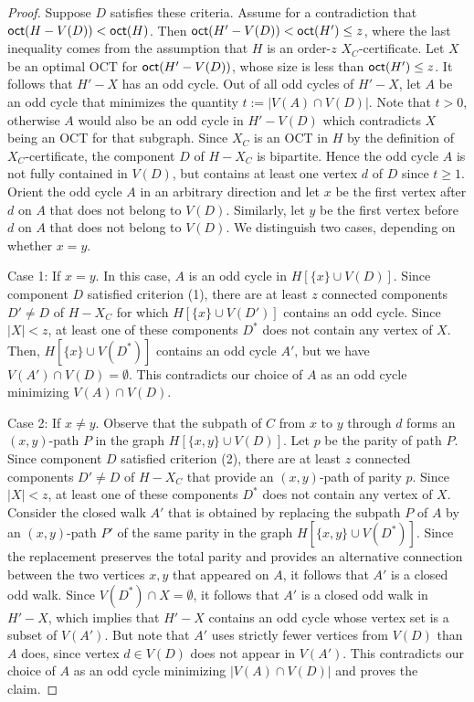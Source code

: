 \begin{proof}
Suppose $D$ satisfies these criteria.
Assume for a contradiction that $\textnormal{\textsf{oct}}(H - V(D)) < \textnormal{\textsf{oct}}(H)$.
Then $\textnormal{\textsf{oct}}(H' - V(D)) < \textnormal{\textsf{oct}}(H') \leq z$,
where the last inequality comes from the assumption that $H$ is an order-$z$ $X_C$-certificate.
%
Let $X$ be an optimal OCT for $\textnormal{\textsf{oct}}(H' - V(D))$, whose size is less than $\textnormal{\textsf{oct}}(H') \leq z$.
It follows that $H' - X$ has an odd cycle.
Out of all odd cycles of $H' - X$,
let $A$ be an odd cycle that minimizes the quantity $t := |V(A) \cap V(D)|$.
Note that $t > 0$, otherwise $A$ would also be an odd cycle in $H' - V(D)$
which contradicts $X$ being an OCT for that subgraph.
%
Since $X_C$ is an OCT in $H$ by the definition of $X_C$-certificate,
the component $D$ of $H - X_C$ is bipartite.
Hence the odd cycle $A$ is not fully contained in $V(D)$,
but contains at least one vertex $d$ of $D$ since $t \geq 1$.
%
Orient the odd cycle $A$ in an arbitrary direction and let $x$ be the first vertex after $d$ on $A$ that does not belong to $V(D)$.
Similarly, let $y$ be the first vertex before $d$ on $A$ that does not belong to $V(D)$.
We distinguish two cases, depending on whether $x=y$.

Case 1: If $x=y$.
In this case, $A$ is an odd cycle in $H[\{x\} \cup V(D)]$.
Since component $D$ satisfied criterion (1),
there are at least $z$ connected components $D' \neq D$ of $H-X_C$
for which $H[\{x\} \cup V(D')]$ contains an odd cycle.
%
Since $|X| < z$, at least one of these components $D^*$ does not contain any vertex of $X$.
Then, $H[\{x\} \cup V(D^*)]$ contains an odd cycle $A'$, but we have $V(A') \cap V(D) = \emptyset$.
This contradicts our choice of $A$ as an odd cycle minimizing $V(A) \cap V(D)$.

Case 2: If $x \neq y$.
Observe that the subpath of $C$ from $x$ to $y$ through $d$ forms an $(x,y)$-path $P$ in the graph $H[\{x,y\} \cup V(D)]$.
%
Let $p$ be the parity of path $P$.
Since component $D$ satisfied criterion (2),
there are at least $z$ connected components $D' \neq D$ of $H-X_C$
that provide an $(x,y)$-path of parity $p$.
%
Since $|X| < z$, at least one of these components $D^*$ does not contain any vertex of $X$.
Consider the closed walk $A'$ that is obtained by replacing the subpath $P$ of $A$ by
an $(x,y)$-path $P'$ of the same parity in the graph $H[\{x,y\} \cup V(D^*)]$.
%
Since the replacement preserves the total parity and provides an alternative connection between
the two vertices $x,y$ that appeared on $A$,
it follows that $A'$ is a closed odd walk.
Since $V(D^*) \cap X = \emptyset$, it follows that $A'$ is a closed odd walk in $H' - X$,
which implies that $H' - X$ contains an odd cycle whose vertex set is a subset of $V(A')$.
But note that $A'$ uses strictly fewer vertices from $V(D)$ than $A$ does,
since vertex $d \in V(D)$ does not appear in $V(A')$.
This contradicts our choice of $A$ as an odd cycle minimizing $|V(A) \cap V(D)|$
and proves the claim.
\end{proof}

